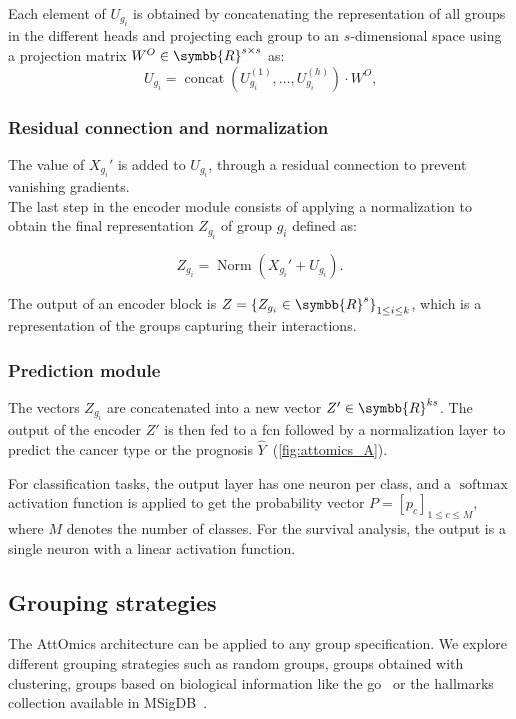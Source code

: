 \documentclass[../main.tex]{subfiles}
\begin{document}
			Each element of \(U_{g_i}\) is obtained by concatenating the representation of all groups in the different heads and projecting each group to an \(s\)-dimensional space using a projection matrix \(W^O \in \symbb{R}^{s\times s}\) as:
			\[ U_{g_i} = \operatorname{concat}\left( U^{(1)}_{g_i}, \ldots, U^{(h)}_{g_i} \right) \cdot W^O \text{,}\]
		\subsubsection{Residual connection and normalization}
			The value of \(X_{g_i}'\) is added to \(U_{g_i}\), through a residual connection to prevent vanishing gradients.\\
			The last step in the encoder module consists of applying a normalization to obtain the final representation \(Z_{g_i}\) of group \(g_i\) defined as:

			\[Z_{g_i} = \operatorname{Norm}\left(X_{g_i}' + U_{g_i} \right) \text{.}\]

			The output of an encoder block is \(Z = {\left\{ Z_{g_i} \in \symbb{R}^{s}\right\}}_{1 \leq i \leq k}\), which is a representation of the groups capturing their interactions.

		\subsubsection{Prediction module}
			The vectors \(Z_{g_i}\) are concatenated into a new vector \(Z' \in \symbb{R}^{ks}\).
			The output of the encoder \(Z'\) is then fed to a \gls{fcn} followed by a normalization layer to predict the cancer type or the prognosis \(\hat{Y}\)~(\cref{fig:attomics_A}).

			For classification tasks, the output layer has one neuron per class, and a \(\operatorname{softmax}\) activation function is applied to get the probability vector \(P = {\left[p_c\right]}_{1\leq c\leq M}\), where \(M\) denotes the number of classes.
			For the survival analysis, the output is a single neuron with a linear activation function.

	\subsection{Grouping strategies}\label{sec:grouping}

		The AttOmics architecture can be applied to any group specification.
		We explore different grouping strategies such as random groups, groups obtained with clustering, groups based on biological information like the \gls{go}~\cite{geneontologyconsortiumGeneOntologyResource2021} or the hallmarks collection available in MSigDB~\cite{Liberzon2015}.
\end{document}
